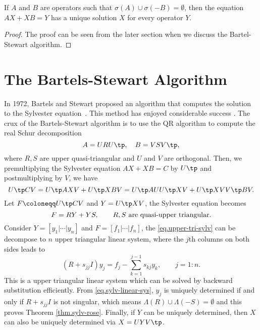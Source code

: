 \documentclass{article}
\begin{document}
\begin{theorem}
\label{thm.sylv-rose}
If $A$ and $B$ are operators such that
$\sigma(A)\cup \sigma(-B) = \emptyset$,
then the equation $AX + XB = Y$ has a unique solution $X$ for
every operator $Y$.
\end{theorem}

\begin{proof}
The proof can be seen from the later section when we discuss the
Bartel-Stewart algorithm.
\end{proof}

\section{The Bartels-Stewart Algorithm}
In 1972, Bartels and Stewart proposed an algorithm that computes the
solution to the Sylvester equation~.
This method has enjoyed considerable success .
The crux of the Bartels-Stewart algorithm is to use the QR algorithm
to compute the real Schur decomposition
\begin{equation}\label{eq.bsalg.decomp}
  A = U R U\tp, \quad B = V S V\tp,
\end{equation}
where $R,S$ are upper quasi-triangular and $U$ and $V$ are orthogonal.
Then, we premultiplying the Sylvester equation $AX + XB = C$ by $U\tp$
and postmultiplying by $V$, we have
\begin{equation}\label{eq.upper-tri-sylv}
  U\tp C V = U\tp A X V + U\tp X B V = U\tp A UU\tp X V + U\tp X VV\tp B V.
\end{equation}
Let $F\coloneqq U\tp CV$ and $Y = U\tp XV$, the Sylvester equation becomes
\begin{equation}\notag
  F = RY + YS, \qquad \text{$R,S$ are quasi-upper triangular.}
\end{equation}
Consider $Y = [y_{1}|\cdots|y_{n}]$ and $F = [f_{1}|\cdots|f_{n}]$,
the \eqref{eq.upper-tri-sylv} can be decompose to $n$ upper triangular
linear system, where the $j$th columns on both sides leads to
\begin{equation}\label{eq.sylv-linear-sys}
  (R + s_{jj}I)y_{j} = f_{j} - \sum_{k=1}^{j-1}s_{kj}y_{k},
  \qquad j = 1\colon n.
\end{equation}
This is a upper triangular linear system which can be solved by backward
substitution efficiently. From \eqref{eq.sylv-linear-sys}, $y_{j}$ is
uniquely determined if and only if $R + s_{jj}I$ is not singular, which
means $\Lambda(R)\cup \Lambda(-S) = \emptyset$ and this proves Theorem
\ref{thm.sylv-rose}. Finally, if $Y$ can be uniquely determined, then $X$
can also be uniquely determined via $X = UYV\tp$.
\end{document}

